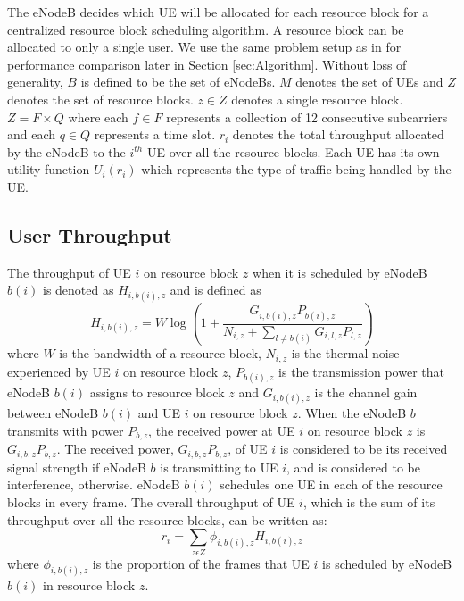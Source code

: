 \documentclass[journal]{IEEEtran} 				\IEEEoverridecommandlockouts 	\usepackage{amsmath,amssymb}
\begin{document}
The eNodeB decides which UE will be allocated for each resource block for a centralized resource block scheduling algorithm. A resource block can be allocated to only a single user. We use the same problem setup as in \cite{SelfOrganizedLTE} for performance comparison later in Section \ref{sec:Algorithm}. Without loss of generality, $B$ is defined to be the set of eNodeBs. $M$ denotes the set of UEs and $Z$ denotes the set of resource blocks. $z \in Z$ denotes a single resource block. $Z=F \times Q$ where each $f \in F$ represents a collection of 12 consecutive subcarriers and each $q \in Q$ represents a time slot. $r_i$ denotes the total throughput allocated by the eNodeB to the $i^{th}$ UE over all the resource blocks. Each UE has its own utility function $U_i(r_i)$ which represents the type of traffic being handled by the UE.  

\subsection{User Throughput}\label{sec:throughput}

The throughput of UE $i$ on resource block $z$ when it is scheduled by eNodeB $b(i)$ is denoted as $H_{i,b(i),z}$ and is defined as 
\begin{equation}
H_{i,b(i),z} = W \log(1+ \frac{G_{i,b(i),z}P_{b(i),z}}{N_{i,z}+\sum_{l \neq b(i)}G_{i,l,z}P_{l,z}}) 
\end{equation}
where $W$ is the bandwidth of a resource block, $N_{i,z}$ is the thermal noise experienced by UE $i$ on resource block $z$, $P_{b(i),z}$ is the transmission power that eNodeB $b(i)$ assigns to resource block $z$ and $G_{i,b(i),z}$ is the channel gain between eNodeB $b(i)$ and UE $i$ on resource block $z$. When the eNodeB $b$ transmits with power $P_{b,z}$, the received power at UE $i$ on resource block $z$ is $G_{i,b,z}P_{b,z}$. The received power, $G_{i,b,z}P_{b,z}$, of UE $i$ is considered to be its received signal strength if eNodeB $b$ is transmitting to UE $i$, and is considered to be interference, otherwise. eNodeB $b(i)$ schedules one UE in each of the resource blocks in every frame. The overall throughput of UE $i$, which is the sum of its throughput over all the resource blocks, can be written as:
\begin{equation}\label{eqn:throughput}
r_i = \sum_{z\epsilon Z}\phi_{i,b(i),z} H_{i,b(i),z} 
\end{equation}
where $\phi_{i,b(i),z}$ is the proportion of the frames that UE $i$ is scheduled by eNodeB $b(i)$ in resource block $z$.
\end{document}
